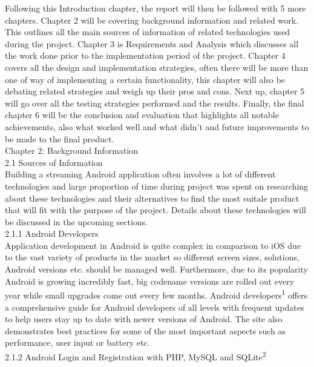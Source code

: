 \documentclass{article}
\begin{document}
\begin{flushleft}
Following this Introduction chapter, the report will then be followed with 5 more chapters. Chapter 2 will be covering background information and related work. This outlines all the main sources of information of related technologies used during the project. Chapter 3 is Requirements and Analysis which discusses all the work done prior to the implementation period of the project. Chapter 4 covers  all the design and implementation strategies, often there will be more than one of way of implementing a certain functionality, this chapter will also be debating related strategies and weigh up their pros and cons. Next up, chapter 5 will go over all the testing strategies performed and the results. Finally, the final chapter 6 will be the conclusion and evaluation that highlights all notable achievements, also what worked well and what didn't and future improvements to be made to the final product.\\
{\huge Chapter 2: Background Information}\\[0.5cm]
{\Large 2.1 Sources of Information}\\
Building a streaming Android application often involves a lot of different technologies and large proportion of time during project was spent on researching about these technologies and their alternatives to find the most suitale product that will fit with the purpose of the project. Details about these technologies will be discussed in the upcoming sections.\\
{\large 2.1.1 Android Developers}\\
Application development in Android is quite complex in comparison to iOS due to the vast variety of products in the market so different screen sizes, solutions, Android versions etc. should be managed well. Furthermore, due to its popularity Android is growing incredibly fast, big codename versions are rolled out every year while small upgrades come out every few months. Android developers\textsuperscript{1} offers a comprehensive guide for Android developers of all levels with frequent updates to help users stay up to date with newer versions of Android. The site also demonstrates best practices for some of the most important aspects such as performance, user input or battery etc.  \\
{\large 2.1.2 Android Login and Registration with PHP, MySQL and SQLite\textsuperscript{2}}\\

\end{flushleft}
\end{document}

